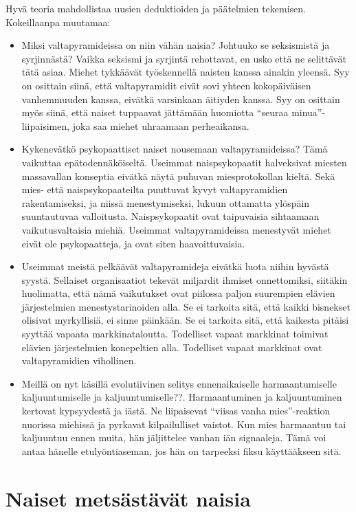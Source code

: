 Hyvä teoria mahdollistaa uusien deduktioiden ja päätelmien tekemisen. Kokeillaanpa muutamaa:
\begin{itemize}
\item Miksi valtapyramideissa on niin vähän naisia? Johtuuko se seksismistä ja syrjinnästä? Vaikka seksismi ja syrjintä rehottavat, en usko että ne selittävät tätä asiaa. Miehet tykkäävät työskennellä naisten kanssa ainakin yleensä. Syy on osittain siinä, että valtapyramidit eivät sovi yhteen kokopäiväisen vanhemmuuden kanssa, eivätkä varsinkaan äitiyden kanssa. Syy on osittain myös siinä, että naiset tuppaavat jättämään huomiotta ``seuraa minua''-liipaisimen, joka saa miehet uhraamaan perheaikansa.
\item Kykenevätkö psykopaattiset naiset nousemaan valtapyramideissa? Tämä vaikuttaa epätodennäköiseltä. Useimmat naispsykopaatit halveksivat miesten massavallan konseptia eivätkä näytä puhuvan miesprotokollan kieltä. Sekä mies- että naispsykopaateilta puuttuvat kyvyt valtapyramidien rakentamiseksi, ja niissä menestymiseksi, lukuun ottamatta ylöspäin suuntautuvaa valloitusta. Naispsykopaatit ovat taipuvaisia sihtaamaan vaikutusvaltaisia miehiä. Useimmat valtapyramideissa menestyvät miehet eivät ole psykopaatteja, ja ovat siten haavoittuvaisia.
\item Useimmat meistä pelkäävät valtapyramideja eivätkä luota niihin hyvästä syystä. Sellaiset organisaatiot tekevät miljardit ihmiset onnettomiksi, siitäkin huolimatta, että nämä vaikutukset ovat piilossa paljon suurempien elävien järjestelmien menestystarinoiden alla. Se ei tarkoita sitä, että kaikki bisnekset olisivat myrkyllisiä, ei sinne päinkään. Se ei tarkoita sitä, että kaikesta pitäisi syyttää vapaata markkinataloutta. Todelliset vapaat markkinat toimivat elävien järjestelmien konepeltien alla. Todelliset vapaat markkinat ovat valtapyramidien vihollinen.
\item Meillä on nyt käsillä evolutiivinen selitys ennenaikaiselle harmaantumiselle kaljuuntumiselle ja kaljuuntumiselle??. Harmaantuminen ja kaljuuntuminen kertovat kypsyydestä ja iästä. Ne liipaisevat ``viisas vanha mies''-reaktion nuorissa miehissä ja pyrkavat kilpailulliset vaistot. Kun mies harmaantuu tai kaljuuntuu ennen muita, hän jäljittelee vanhan iän signaaleja. Tämä voi antaa hänelle etulyöntiaseman, jos hän on tarpeeksi fiksu käyttääkseen sitä.
\end{itemize}

\section{Naiset metsästävät naisia}

